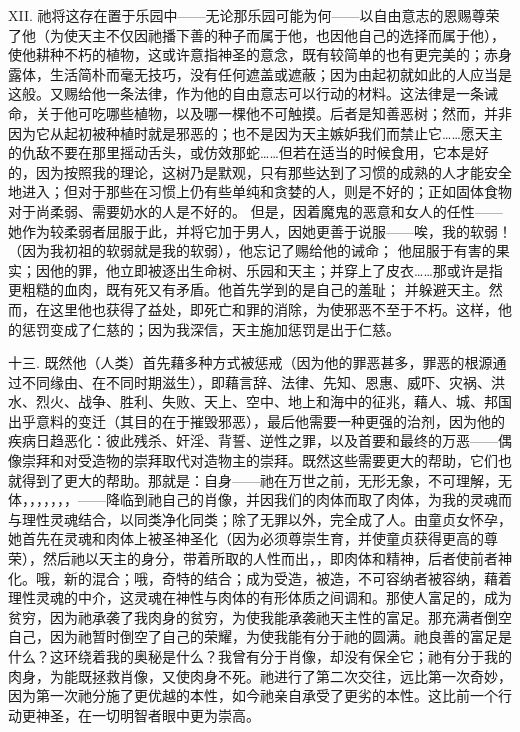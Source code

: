 XII. 祂将这存在置于乐园中——无论那乐园可能为何——以自由意志的恩赐尊荣了他（为使天主不仅因祂播下善的种子而属于他，也因他自己的选择而属于他），使他耕种不朽的植物，这或许意指神圣的意念，既有较简单的也有更完美的；赤身露体，生活简朴而毫无技巧，没有任何遮盖或遮蔽；因为由起初就如此的人应当是这般。又赐给他一条法律，作为他的自由意志可以行动的材料。这法律是一条诫命，关于他可吃哪些植物，以及哪一棵他不可触摸。后者是知善恶树；然而，并非因为它从起初被种植时就是邪恶的；也不是因为天主嫉妒我们而禁止它……愿天主的仇敌不要在那里摇动舌头，或仿效那蛇……但若在适当的时候食用，它本是好的，因为按照我的理论，这树乃是默观，只有那些达到了习惯的成熟的人才能安全地进入；但对于那些在习惯上仍有些单纯和贪婪的人，则是不好的；正如固体食物对于尚柔弱、需要奶水的人是不好的。 但是，因着魔鬼的恶意和女人的任性——她作为较柔弱者屈服于此，并将它加于男人，因她更善于说服——唉，我的软弱！（因为我初祖的软弱就是我的软弱），他忘记了赐给他的诫命； 他屈服于有害的果实；因他的罪，他立即被逐出生命树、乐园和天主；并穿上了皮衣……那或许是指更粗糙的血肉，既有死又有矛盾。他首先学到的是自己的羞耻； 并躲避天主。然而，在这里他也获得了益处，即死亡和罪的消除，为使邪恶不至于不朽。这样，他的惩罚变成了仁慈的；因为我深信，天主施加惩罚是出于仁慈。\par

十三. 既然他（人类）首先藉多种方式被惩戒（因为他的罪恶甚多，罪恶的根源通过不同缘由、在不同时期滋生），即藉言辞、法律、先知、恩惠、威吓、灾祸、洪水、烈火、战争、胜利、失败、天上、空中、地上和海中的征兆，藉人、城、邦国出乎意料的变迁（其目的在于摧毁邪恶），最后他需要一种更强的治剂，因为他的疾病日趋恶化：彼此残杀、奸淫、背誓、逆性之罪，以及首要和最终的万恶——偶像崇拜和对受造物的崇拜取代对造物主的崇拜。既然这些需要更大的帮助，它们也就得到了更大的帮助。那就是：自身——祂在万世之前，无形无象，不可理解，无体，，，，，，，——降临到祂自己的肖像，并因我们的肉体而取了肉体，为我的灵魂而与理性灵魂结合，以同类净化同类；除了无罪以外，完全成了人。由童贞女怀孕，她首先在灵魂和肉体上被圣神圣化（因为必须尊崇生育，并使童贞获得更高的尊荣），然后祂以天主的身分，带着所取的人性而出，，即肉体和精神，后者使前者神化。哦，新的混合；哦，奇特的结合；成为受造，被造，不可容纳者被容纳，藉着理性灵魂的中介，这灵魂在神性与肉体的有形体质之间调和。那使人富足的，成为贫穷，因为祂承袭了我肉身的贫穷，为使我能承袭祂天主性的富足。那充满者倒空自己，因为祂暂时倒空了自己的荣耀，为使我能有分于祂的圆满。祂良善的富足是什么？这环绕着我的奥秘是什么？我曾有分于肖像，却没有保全它；祂有分于我的肉身，为能既拯救肖像，又使肉身不死。祂进行了第二次交往，远比第一次奇妙，因为第一次祂分施了更优越的本性，如今祂亲自承受了更劣的本性。这比前一个行动更神圣，在一切明智者眼中更为崇高。\par

